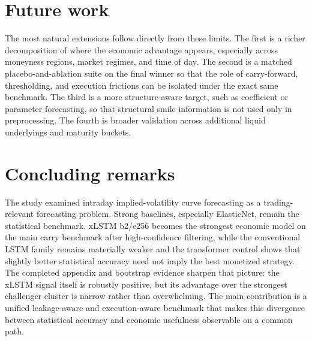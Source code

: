\documentclass[12pt]{report}
\begin{document}
\section{Future work}
The most natural extensions follow directly from these limits. The first is a richer decomposition of where the economic advantage appears, especially across moneyness regions, market regimes, and time of day. The second is a matched placebo-and-ablation suite on the final winner so that the role of carry-forward, thresholding, and execution frictions can be isolated under the exact same benchmark. The third is a more structure-aware target, such as coefficient or parameter forecasting, so that structural smile information is not used only in preprocessing. The fourth is broader validation across additional liquid underlyings and maturity buckets.

\section*{Concluding remarks}
The study examined intraday implied-volatility curve forecasting as a trading-relevant forecasting problem. Strong baselines, especially ElasticNet, remain the statistical benchmark. xLSTM b2/e256 becomes the strongest economic model on the main carry benchmark after high-confidence filtering, while the conventional LSTM family remains materially weaker and the transformer control shows that slightly better statistical accuracy need not imply the best monetized strategy. The completed appendix and bootstrap evidence sharpen that picture: the xLSTM signal itself is robustly positive, but its advantage over the strongest challenger cluster is narrow rather than overwhelming. The main contribution is a unified leakage-aware and execution-aware benchmark that makes this divergence between statistical accuracy and economic usefulness observable on a common path.
\end{document}
